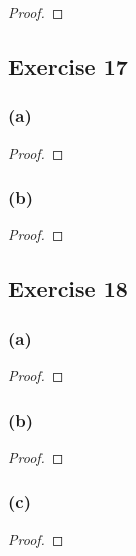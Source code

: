 \documentclass[14pt]{extarticle}
\begin{document}
\begin{proof}

\end{proof}

\subsection{Exercise 17}

\subsubsection{(a)}

\begin{proof}

\end{proof}

\subsubsection{(b)}

\begin{proof}

\end{proof}

\subsection{Exercise 18}

\subsubsection{(a)}

\begin{proof}

\end{proof}

\subsubsection{(b)}

\begin{proof}

\end{proof}

\subsubsection{(c)}

\begin{proof}

\end{proof}
\end{document}
